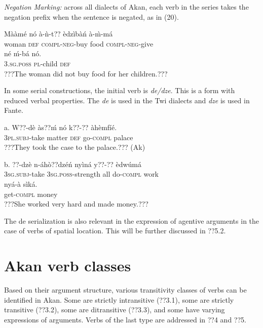 \documentclass[output=paper]{langsci/langscibook}
\begin{document}
\begin{styleListei}
\emph{Negation Marking:} across all dialects of Akan, each verb in the series takes the negation prefix when the sentence is negated, as in (20). 
\end{styleListei}

\ea
\gll Mààmé  nó  à-ǹ-t??      èdzìbàń  à-\`{m}-má  \\
     woman  \textsc{def}  \textsc{compl}{}-\textsc{neg}{}-buy  food    \textsc{compl}{}-\textsc{neg}{}-give\\
\gll né    ḿ-bá    nó.\\
     \textsc{3.sg.poss}  \textsc{pl}{}-child  \textsc{def}\\
\glt ???The woman did not buy food for her children.???
\z

In some serial constructions, the initial verb is \emph{de/dze}. This is a form with reduced verbal properties. The \emph{de }is used in the Twi dialects and \emph{dze} is used in Fante. 

\ea
\gll a.  W??-dè    às??ḿ  nó  k??-??    àhèmfíé.\\
       \textsc{3pl.subj}{}-take  matter  \textsc{def}  go-\textsc{compl}  palace\\
\glt   ???They took the case to the palace.??? (Ak)
\z

\ea
\gll  b.  ??{}-dzè    n-áhò??dzéń    nyìná  y??-??     èdwúmá \\
       \textsc{3sg.subj}{}-take  \textsc{3sg.poss}{}-strength  all  do-\textsc{compl}  work\\
\gll   nyá-à    sìká.\\
       get-\textsc{compl}  money\\
\glt   ???She worked very hard and made money.???
\z

The de serialization is also relevant in the expression of agentive arguments in the case of verbs of spatial location. This will be further discussed in ??5.2.

\section{Akan verb classes}

Based on their argument structure, various transitivity classes of verbs can be identified in Akan. Some are strictly intransitive (??3.1), some are strictly transitive (??3.2), some are ditransitive (??3.3), and some have varying expressions of arguments. Verbs of the last type are addressed in ??4 and ??5.
\end{document}
